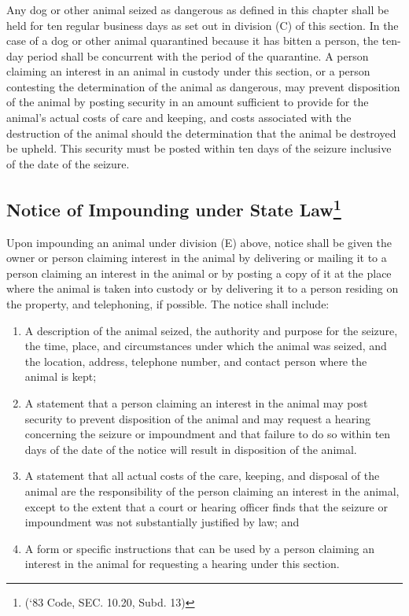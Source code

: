\subsubsection{}
Any dog or other animal seized as dangerous as defined in this chapter shall be held for ten regular business days as set out in division (C) of this section. In the case of a dog or other animal quarantined because it has bitten a person, the ten-day period shall be concurrent with the period of the quarantine. A person claiming an interest in an animal in custody under this section, or a person contesting the determination of the animal as dangerous, may prevent disposition of the animal by posting security in an amount sufficient to provide for the animal’s actual costs of care and keeping, and costs associated with the destruction of the animal should the determination that the animal be destroyed be upheld. This security must be posted within ten days of the seizure inclusive of the date of the seizure.
\subsection{Notice of Impounding under State Law\footnote{(‘83 Code, SEC. 10.20, Subd. 13)}}
Upon impounding an animal under division (E) above, notice shall be given the owner or person claiming interest in the animal by delivering or mailing it to a person claiming an interest in the animal or by posting a copy of it at the place where the animal is taken into custody or by delivering it to a person residing on the property, and telephoning, if possible. The notice shall include:
\begin{enumerate}[{\indent}1)]
    \item A description of the animal seized, the authority and purpose for the seizure, the time, place, and circumstances under which the animal was seized, and the location, address, telephone number, and contact person where the animal is kept;
    \item A statement that a person claiming an interest in the animal may post security to prevent disposition of the animal and may request a hearing concerning the seizure or impoundment and that failure to do so within ten days of the date of the notice will result in disposition of the animal.
    \item A statement that all actual costs of the care, keeping, and disposal of the animal are the responsibility of the person claiming an interest in the animal, except to the extent that a court or hearing officer finds that the seizure or impoundment was not substantially justified by law; and
    \item A form or specific instructions that can be used by a person claiming an interest in the animal for requesting a hearing under this section.
\end{enumerate}
